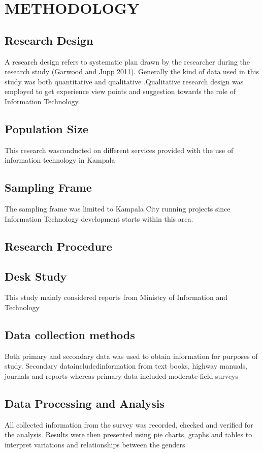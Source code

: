 \documentclass[11pt,A4paper]{article}
\begin{document}
\section{METHODOLOGY}
\subsection{Research Design}
A research design refers to systematic plan drawn by the researcher during the research study (Garwood and Jupp 2011). Generally the kind of data used in this study was both quantitative and qualitative .Qualitative research design was employed to get experience view points and suggestion towards the role of Information Technology.
\subsection{Population Size}
This research wasconducted on different services provided with the use of information technology in Kampala 
\subsection{Sampling Frame}
The sampling frame was limited to Kampala City running projects since Information Technology development starts within this area. 
\subsection{Research Procedure}
\subsection{Desk Study}
This study mainly considered reports from Ministry of Information and Technology

\subsection{Data collection methods}
Both primary and secondary data was used to obtain information for purposes of study. Secondary dataincludedinformation from text books, highway manuals, journals and reports whereas primary data included moderate field surveys

\subsection{Data Processing and Analysis}

All collected information from the survey was recorded, checked and verified for the analysis. Results were then presented using pie charts, graphs and tables to interpret variations and relationships between the genders
\end{document}
